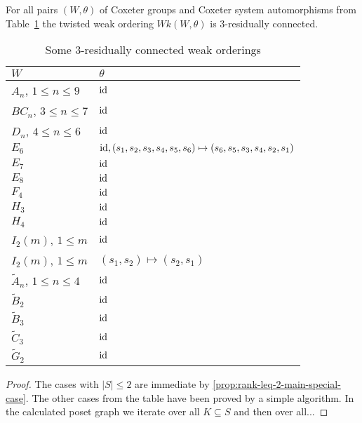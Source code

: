 \begin{theo}
	For all pairs $(W,\theta)$ of Coxeter groups and Coxeter system automorphisms from Table~\ref{tab:rc3-wks} the twisted weak ordering $Wk(W,\theta)$ is 3-residually connected.

	\begin{table}[ht]
		\centering
		\begin{tabular}{ll}
			$W$ & $\theta$ \\
			\hline
			$A_n$, $1 \leq n \leq 9$ & $\operatorname{id}$ \\
			$BC_{n}$, $3 \leq n \leq 7$ & $\operatorname{id}$ \\
			$D_{n}$, $4 \leq n \leq 6$ & $\operatorname{id}$ \\
			$E_6$ & $\operatorname{id}, (s_1,s_2,s_3,s_4,s_5,s_6) \mapsto (s_6,s_5,s_3,s_4,s_2,s_1)$ \\
			$E_7$ & $\operatorname{id}$ \\
			$E_8$ & $\operatorname{id}$ \\
			$F_4$ & $\operatorname{id}$ \\
			$H_3$ & $\operatorname{id}$ \\
			$H_4$ & $\operatorname{id}$ \\
			$I_2(m)$, $1 \leq m$ & $\operatorname{id}$ \\
			$I_2(m)$, $1 \leq m$ & $(s_1,s_2) \mapsto (s_2,s_1)$ \\
			$\tilde A_{n}$, $1 \leq n \leq 4$ & $\operatorname{id}$ \\
			$\tilde B_{2}$ & $\operatorname{id}$ \\
			$\tilde B_{3}$ & $\operatorname{id}$ \\
			$\tilde C_{3}$ & $\operatorname{id}$ \\
			$\tilde G_2$ & $\operatorname{id}$ \\
		\end{tabular}
		\caption{Some 3-residually connected weak orderings}
		\label{tab:rc3-wks}	
	\end{table}

	\begin{proof}
		The cases with $|S| \leq 2$ are immediate by \ref{prop:rank-leq-2-main-special-case}. The other cases from the table have been proved by a simple algorithm. In the calculated poset graph we iterate over all $K \subseteq S$ and then over all... \todo
	\end{proof}
\end{theo}
